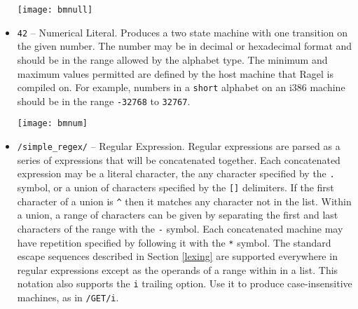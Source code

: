 \documentclass[letterpaper,11pt,oneside]{book}
\begin{document}
\begin{itemize}
\begin{comment}
\begin{verbatim}
main := '';
\end{verbatim}
\end{comment}

\begin{center}
\texttt{[image: bmnull]}
\end{center}

\item \verb|42| -- Numerical Literal. Produces a two state machine with one
transition on the given number. The number may be in decimal or hexadecimal
format and should be in the range allowed by the alphabet type. The minimum and
maximum values permitted are defined by the host machine that Ragel is compiled
on. For example, numbers in a \verb|short| alphabet on an i386 machine should
be in the range \verb|-32768| to \verb|32767|.

\begin{comment}
\begin{verbatim}
main := 42;
\end{verbatim}
\end{comment}

\begin{center}
\texttt{[image: bmnum]}
\end{center}

\item \verb|/simple_regex/| -- Regular Expression. Regular expressions are
parsed as a series of expressions that will be concatenated together. Each
concatenated expression
may be a literal character, the any character specified by the \verb|.|
symbol, or a union of characters specified by the \verb|[]| delimiters. If the
first character of a union is \verb|^| then it matches any character not in the
list. Within a union, a range of characters can be given by separating the first
and last characters of the range with the \verb|-| symbol. Each
concatenated machine may have repetition specified by following it with the
\verb|*| symbol. The standard escape sequences described in Section
\ref{lexing} are supported everywhere in regular expressions except as the
operands of a range within in a list. This notation also supports the \verb|i|
trailing option. Use it to produce case-insensitive machines, as in \verb|/GET/i|.


\end{itemize}
\end{document}
